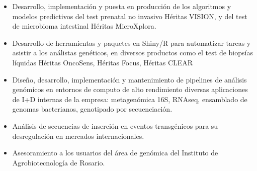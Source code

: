 \documentclass[10pt,a4paper,ragged2e]{altacv}
\begin{document}
\divider

\begin{itemize}
\item Desarrollo, implementación y puesta en producción de los algoritmos y modelos predictivos del test prenatal no invasivo
Héritas VISION, y del test de microbioma intestinal Héritas MicroXplora.
\item Desarrollo de herramientas y paquetes en Shiny/R para automatizar tareas y asistir a los análistas genéticos, en diversos
productos como el test de biopsías líquidas Héritas OncoSens, Héritas Focus, Héritas CLEAR
\item Diseño, desarrollo, implementación y mantenimiento de pipelines de análisis genómicos en entornos de computo de
alto rendimiento diversas aplicaciones de I+D internas de la empresa: metagenómica 16S, RNAseq, ensamblado de genomas bacterianos, genotipado por secuenciación.
\item Análisis de secuencias de inserción en eventos transgénicos para su desregulación en mercados internacionales.
\item Asesoramiento a los usuarios del área de genómica del Instituto de Agrobiotecnología de Rosario.
\end{itemize}



\divider


\end{document}
